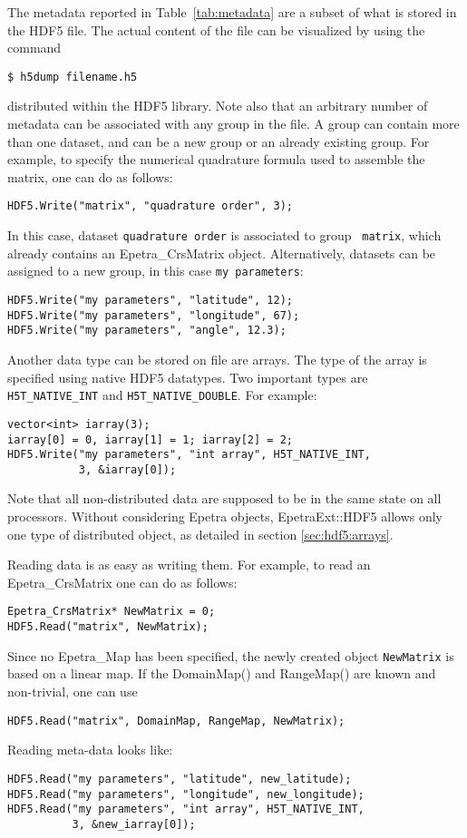 \documentclass[11pt,relax]{SANDreport}
\begin{document}
The metadata reported in Table~\ref{tab:metadata} are a subset of what is
stored in the HDF5 file. The actual content of the file can be visualized by
using the command
\begin{verbatim}
$ h5dump filename.h5
\end{verbatim}
distributed within the HDF5 library. Note also that an arbitrary number of
metadata can be associated with any group in the file.  A group can contain
more than one dataset, and can be a new group or an already existing group.
For example, to specify the numerical quadrature formula used to assemble the
matrix, one can do as follows:
\begin{verbatim}
HDF5.Write("matrix", "quadrature order", 3);
\end{verbatim}
In this case, dataset {\tt quadrature order} is associated to group {\tt
  matrix}, which already contains an Epetra\_CrsMatrix object.
Alternatively, datasets can be assigned to a new group, in this case
{\tt my parameters}:
\begin{verbatim}
HDF5.Write("my parameters", "latitude", 12);
HDF5.Write("my parameters", "longitude", 67);
HDF5.Write("my parameters", "angle", 12.3);
\end{verbatim}
Another data type can be stored on file are arrays. The type of the array is
specified using native HDF5 datatypes. Two important types are {\tt
  H5T\_NATIVE\_INT} and {\tt H5T\_NATIVE\_DOUBLE}. For example:
\begin{verbatim}
vector<int> iarray(3);
iarray[0] = 0, iarray[1] = 1; iarray[2] = 2;
HDF5.Write("my parameters", "int array", H5T_NATIVE_INT,
           3, &iarray[0]);
\end{verbatim}
Note that all non-distributed data are supposed to be in the same state on all
processors. Without considering Epetra objects, EpetraExt::HDF5 allows only
one type of distributed object, as detailed in section \ref{sec:hdf5:arrays}.

\smallskip

Reading data is as easy as writing them. For example, to read an
Epetra\_CrsMatrix one can do as follows:
\begin{verbatim}
Epetra_CrsMatrix* NewMatrix = 0;
HDF5.Read("matrix", NewMatrix);
\end{verbatim}
Since no Epetra\_Map has been specified,
the newly created object {\tt NewMatrix} is based on a linear map. If the DomainMap() and RangeMap() are
known and non-trivial, one can use
\begin{verbatim}
HDF5.Read("matrix", DomainMap, RangeMap, NewMatrix);
\end{verbatim}
Reading meta-data looks like:
\begin{verbatim}
HDF5.Read("my parameters", "latitude", new_latitude);
HDF5.Read("my parameters", "longitude", new_longitude);
HDF5.Read("my parameters", "int array", H5T_NATIVE_INT,
          3, &new_iarray[0]);
\end{verbatim}
\end{document}
